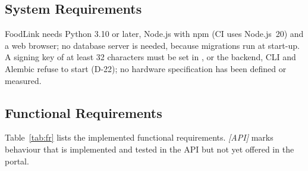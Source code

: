 \subsection{System Requirements}
\label{sec:sysreq}

FoodLink needs Python 3.10 or later, Node.js with npm (CI uses Node.js~20) and a
web browser; no database server is needed, because migrations run at start-up. A
signing key of at least 32 characters must be set in ,
or the backend, CLI and Alembic refuse to start (D-22); no hardware
specification has been defined or measured.

\subsection{Functional Requirements}
\label{sec:fr}

Table~\ref{tab:fr} lists the implemented functional requirements. \emph{[API]}
marks behaviour that is implemented and tested in the API but not yet offered in
the portal.

